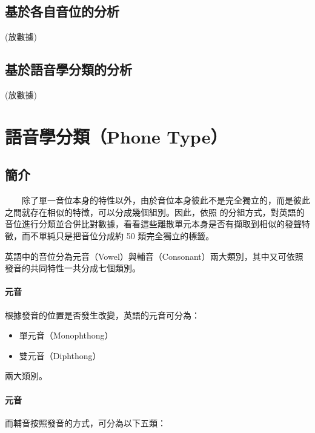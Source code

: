 
\subsection{基於各自音位的分析}

(放數據)

\subsection{基於語音學分類的分析}

(放數據)

\section{語音學分類（Phone Type）}

\subsection{簡介}

　　除了單一音位本身的特性以外，由於音位本身彼此不是完全獨立的，而是彼此之間就存在相似的特徵，可以分成幾個組別。因此，依照  的分組方式，對英語的音位進行分類並合併比對數據，看看這些離散單元本身是否有擷取到相似的發聲特徵，而不單純只是把音位分成約 50 類完全獨立的標籤。


        英語中的音位分為元音（Vowel）與輔音（Consonant）兩大類別，其中又可依照發音的共同特性一共分成七個類別。

\paragraph{元音}


根據發音的位置是否發生改變，英語的元音可分為：

\begin{itemize}
    \item 單元音（Monophthong）
    \item 雙元音（Diphthong）
\end{itemize}

兩大類別。

\paragraph{元音}

而輔音按照發音的方式，可分為以下五類：

